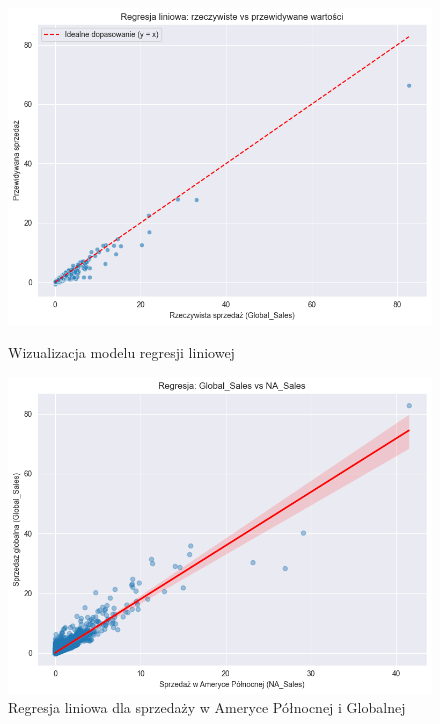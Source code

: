 \documentclass[11pt]{article}
\begin{document}
\begin{figure}[H]
    \centering
    \begin{minipage}[t]{0.48\linewidth}
        \centering
        \includegraphics[width=\linewidth]{figures/reglin-last}
        \caption{Wizualizacja modelu regresji liniowej}
        \label{fig:reg-model}
    \end{minipage}
    \hfill
    \begin{minipage}[t]{0.48\linewidth}
        \centering
        \includegraphics[width=\linewidth]{figures/reglin-solo}
        \caption{Regresja liniowa dla sprzedaży w Ameryce Północnej i Globalnej}
        \label{fig:reg-NA}
    \end{minipage}
\end{figure}
\end{document}
